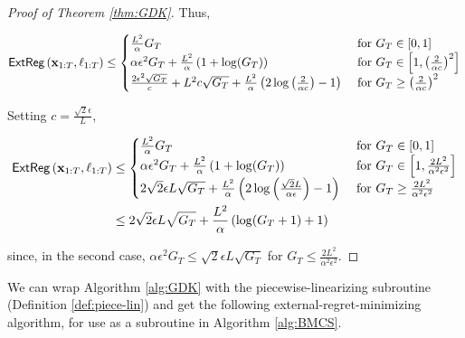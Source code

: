 \begin{proof}[Proof of Theorem \ref{thm:GDK}]
Thus,

\begin{align*}
    \mathsf{ExtReg}\left(\mathbf{x}_{1:T},\ell_{1:T}\right) \leq \begin{cases}
        \frac{L^2}{\alpha}G_T & \text{ for }G_T \in [0,1]\\
        \alpha\epsilon^2G_T+\frac{L^2}{\alpha}\left(1+\log(G_T)\right) & \text{ for }G_T \in \left[1,\left(\frac{2}{\alpha c}\right)^2\right]\\
        \frac{2\epsilon^2\sqrt{G_T}}{c}+ L^2c\sqrt{G_T} + \frac{L^2}{\alpha}\left(2\log\left(\frac{2}{\alpha c}\right)-1\right)& \text{ for } G_T \geq \left(\frac{2}{\alpha c}\right)^2
    \end{cases}
\end{align*}

Setting $c = \frac{\sqrt{2}\epsilon}{L}$,

\begin{align*}
    \mathsf{ExtReg}\left(\mathbf{x}_{1:T},\ell_{1:T}\right) &\leq \begin{cases}
        \frac{L^2}{\alpha}G_T & \text{ for }G_T \in [0,1]\\
        \alpha\epsilon^2G_T+\frac{L^2}{\alpha}\left(1+\log(G_T)\right) & \text{ for }G_T \in \left[1,\frac{2L^2}{\alpha^2 \epsilon^2}\right]\\
        2\sqrt{2}\epsilon L\sqrt{G_T} + \frac{L^2}{\alpha}\left(2\log\left(\frac{\sqrt{2}L}{\alpha \epsilon}\right)-1\right)& \text{ for } G_T \geq \frac{2L^2}{\alpha^2 \epsilon^2}
    \end{cases}\\
    & \leq 2\sqrt{2}\epsilon L\sqrt{G_T} + \frac{L^2}{\alpha}\left(\log(G_T+1)+1\right)
\end{align*}

since, in the second case, $\alpha\epsilon^2G_T \leq \sqrt{2}\epsilon L\sqrt{G_T}$ for $G_T \leq \frac{2L^2}{\alpha^2 \epsilon^2}$.


\end{proof}



We can wrap Algorithm \ref{alg:GDK} with the piecewise-linearizing subroutine (Definition \ref{def:piece-lin}) and get the following external-regret-minimizing algorithm, for use as a subroutine in Algorithm \ref{alg:BMCS}.

